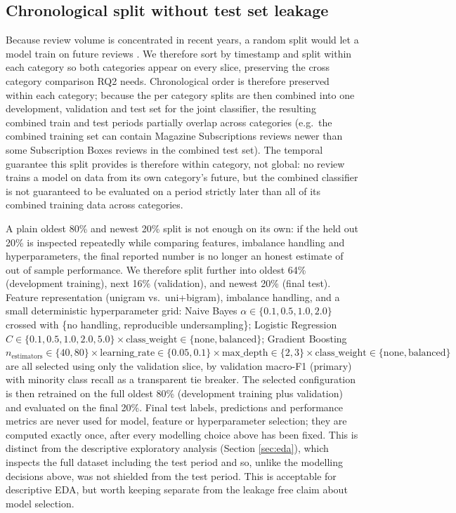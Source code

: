 \documentclass[11pt,a4paper,DIV=12]{scrartcl}
\begin{document}
\subsection{Chronological split without test set leakage}
\label{sec:method-split}
Because review volume is concentrated in recent years, a random split would let a
model train on future reviews \citep{sculley2015hidden}. We therefore sort by
timestamp and split within each category so both categories appear on
every slice, preserving the cross category comparison RQ2 needs. Chronological
order is therefore preserved within each category; because the
per category splits are then combined into one development, validation and test set
for the joint classifier, the resulting combined train and test periods
partially overlap across categories (e.g.\ the combined training set can
contain Magazine Subscriptions reviews newer than some Subscription Boxes
reviews in the combined test set). The temporal guarantee this
split provides is therefore within category, not global: no review
trains a model on data from its own category's future, but the combined
classifier is not guaranteed to be evaluated on a period strictly later than
all of its combined training data across categories.

A plain oldest 80\% and newest 20\% split is not enough on its own: if the held out
20\% is inspected repeatedly while comparing features, imbalance handling and
hyperparameters, the final reported number is no longer an honest estimate of
out of sample performance. We therefore split further into oldest
64\% (development training), next 16\% (validation), and newest
20\% (final test). Feature representation (unigram vs.\ uni+bigram),
imbalance handling, and a small deterministic hyperparameter grid: Naive
Bayes $\alpha\in\{0.1,0.5,1.0,2.0\}$ crossed with \{no handling, reproducible
undersampling\}; Logistic Regression $C\in\{0.1,0.5,1.0,2.0,5.0\}\times
\text{class\_weight}\in\{\text{none},\text{balanced}\}$; Gradient Boosting
$n_{\text{estimators}}\in\{40,80\}\times\text{learning\_rate}\in\{0.05,0.1\}
\times\text{max\_depth}\in\{2,3\}\times\text{class\_weight}\in\{\text{none},
\text{balanced}\}$ are all selected using only the validation slice,
by validation macro-F1 (primary) with minority class recall as a transparent
tie breaker. The selected configuration is then retrained on the full oldest
80\% (development training plus validation) and evaluated on the final 20\%. Final test
labels, predictions and performance metrics are never used for model,
feature or hyperparameter selection; they are computed exactly once, after
every modelling choice above has been fixed. This is distinct from the
descriptive exploratory analysis (Section \ref{sec:eda}), which inspects the
full dataset including the test period and so, unlike the modelling
decisions above, was not shielded from the test period. This is acceptable for
descriptive EDA, but worth keeping separate from the leakage free claim about
model selection.
\end{document}
